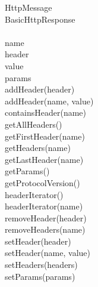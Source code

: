 \documentclass{article}
\begin{document}
\begin{spacing}{1.0}
	\clearpage
	HttpMessage\\
	\noindent BasicHttpResponse\\
	\hspace*{\fill} \\ %
	name\\
	header\\
	value\\
	params
	\hspace*{\fill} \\ %
	addHeader(header) \\
	addHeader(name, value) \\
	containsHeader(name) \\
	getAllHeaders() \\
	getFirstHeader(name)\\
	getHeaders(name) \\
	getLastHeader(name) \\
	getParams() \\
	getProtocolVersion()\\
	headerIterator() \\
	headerIterator(name) \\
	removeHeader(header)\\
	removeHeaders(name) \\
	setHeader(header) \\
	setHeader(name, value) \\
	setHeaders(headers) \\
	setParams(params)\\
	\end{spacing}
\end{document}
